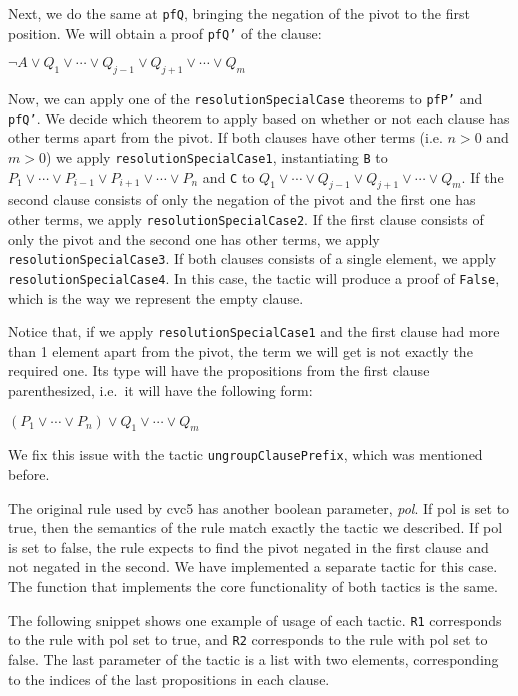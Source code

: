 Next, we do the same at \texttt{pfQ}, bringing the negation of the pivot to the first position. We will obtain a proof \texttt{pfQ'} of
the clause:

\begin{center}
  $\neg A \vee Q_{1} \vee \cdots \vee Q_{j - 1} \vee Q_{j + 1} \vee \cdots \vee Q_{m}$
\end{center}

Now, we can apply one of the \texttt{resolutionSpecialCase} theorems to \texttt{pfP'} and \texttt{pfQ'}. We decide which theorem
to apply based on whether or not each clause has other terms apart from the pivot. If both clauses have other terms (i.e. $n > 0$ and
$m > 0$) we apply \texttt{resolutionSpecialCase1}, instantiating \texttt{B} to $P_{1} \vee \cdots \vee P_{i - 1} \vee P_{i + 1} \vee \cdots \vee P_{n}$ and \texttt{C} to $Q_{1} \vee \cdots \vee Q_{j - 1} \vee Q_{j + 1} \vee \cdots \vee Q_{m}$. If the second clause consists of only the negation of the pivot and the first one has other terms, we apply \texttt{resolutionSpecialCase2}. If the first clause consists of only the pivot and the second one has other terms, we apply \texttt{resolutionSpecialCase3}. If both clauses consists of a single element, we apply \texttt{resolutionSpecialCase4}. In this case, the tactic will produce a proof of \texttt{False}, which is the way we represent the empty clause.

Notice that, if we apply \texttt{resolutionSpecialCase1} and the first clause had more than 1 element
apart from the pivot, the term we will get is not exactly the required one. Its type will have the
propositions from the first clause parenthesized, i.e.\ it will have the following form:

\begin{center}
  $(P_{1} \vee \cdots \vee P_{n}) \vee Q_{1} \vee \cdots \vee Q_{m}$
\end{center}

We fix this issue with the tactic \texttt{ungroupClausePrefix}, which was mentioned before.

The original rule used by cvc5 has another
boolean parameter, \textit{pol}. If pol is set to true, then the semantics of the rule match
exactly the tactic we described. If pol is set to false, the rule expects to find the pivot
negated in the first clause and not negated in the second. We have implemented a separate
tactic for this case. The function that implements the core functionality of both tactics is
the same.

The following snippet shows one example of usage of each tactic. \texttt{R1} corresponds to
the rule with pol set to true, and \texttt{R2} corresponds to the rule with pol set to false.
The last parameter of the tactic is a list with two elements, corresponding to the indices
of the last propositions in each clause.

